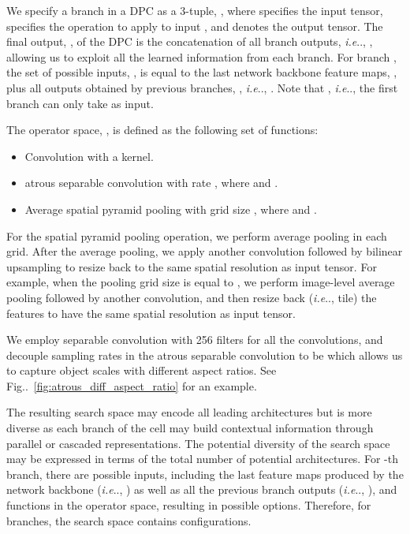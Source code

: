 \documentclass{article}
\makeatletter
\def\@onedot{\ifx\@let@token.\else.\null\fi\xspace}
\DeclareRobustCommand\onedot{\futurelet\@let@token\@onedot}
\newcommand{\figref}[1]{Fig\onedot~\ref{#1}}
\def\ie{\emph{i.e}\onedot} \def\Ie{\emph{I.e}\onedot}
\makeatother
\begin{document}
We specify a branch  in a DPC as a 3-tuple, , where  specifies the input tensor,  specifies the operation to apply to input , and  denotes the output tensor. The final output, , of the DPC is the concatenation of all branch outputs, \ie, , allowing us to exploit all the learned information from each branch. For branch , the set of possible inputs, , is equal to the last network backbone feature
maps, , plus all outputs
obtained by previous branches, , \ie, .
Note that , \ie, the first branch can only take  as input.

The operator space, , is defined as the following set of functions:

\begin{itemize}
\item Convolution with a  kernel.
\item  atrous separable convolution with rate , where  and .
\item Average spatial pyramid pooling with grid size , where  and .
\end{itemize}

For the spatial pyramid pooling operation, we perform average pooling in each grid. After the average pooling,
we apply another  convolution followed by bilinear upsampling to resize back to the
same spatial resolution as input tensor. For example, when the pooling grid size  is equal to ,
we perform image-level average pooling followed by another  convolution, and then resize back
(\ie, tile) the features to have the same spatial resolution as input tensor.

We employ separable convolution  \cite{sifre2014rigid,vanhoucke2014learning,wang2016factorized,chollet2016xception,howard2017mobilenets} with 256 filters for all the convolutions, and decouple sampling rates in the  atrous separable
convolution to be  which allows us to capture object scales with different aspect ratios. See \figref{fig:atrous_diff_aspect_ratio} for an example.



The resulting search space may encode all leading architectures but is more diverse as each branch of the cell may build contextual information through parallel or cascaded representations.
The potential diversity of the search space may be expressed in terms of the total number of potential architectures.
For -th branch, there are  possible inputs, including the last feature maps produced by the network backbone (\ie, ) as well as all the previous branch outputs (\ie, ), and  functions in the operator space, resulting in  possible options. Therefore, for  branches, the search space contains  configurations.
\end{document}
